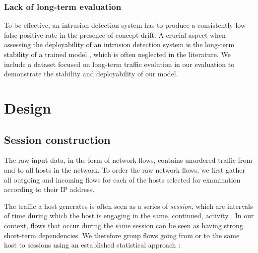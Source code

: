 \subsubsection{Lack of long-term evaluation}

To be effective, an intrusion detection system has to produce a consistently low false positive rate in the presence of concept drift. %
A crucial aspect when assessing the deployability of an intrusion detection system is the long-term stability of a trained model \cite{koutrouki2018mitigating}, which is often neglected in the literature.
We include a dataset focused on long-term traffic evolution in our evaluation to demonstrate the stability and deployability of our model. 




\section{Design}\label{SecF:Design}

\subsection{Session construction}

The raw input data, in the form of network flows, contains unordered traffic from and to all hosts in the network. %
To order the raw network flows, we  first gather all outgoing and incoming flows for each of the hosts selected for examination according to their IP address. 

The traffic a host generates is often seen as a series of \emph{session}, which are intervals of time  during which the host is engaging in the same, continued, activity \cite{rubin2014three}. In our context, flows that occur during the same session can be seen as having strong short-term dependencies. We therefore group flows going from or to the same host to sessions using an established statistical approach \cite{rubin2014three}:

